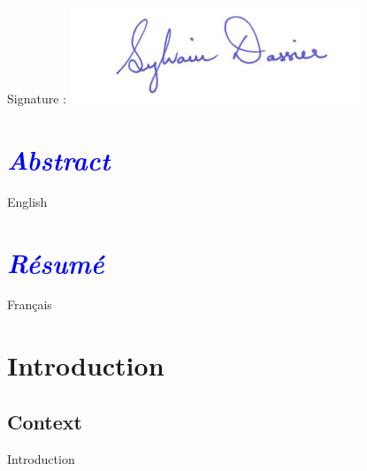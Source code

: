 \documentclass[a4paper,11pt]{article}
\begin{document}
	\vspace{-1cm}
	\hspace{5cm}
	Signature : \includegraphics[scale=0.5]{pictures/signa.jpg}
	
	\clearpage


	\section*{\Huge \textcolor{blue}{\textit{Abstract}}}
	
		\begin{description}
		
			\item \hspace{2cm} English
			
		\end{description}
		
	\section*{\Huge \textcolor{blue}{\textit{Résumé}}}
	
		\begin{description}

			\item \hspace{2cm} Français
			
		\end{description}
		
	

	\clearpage

	\setcounter{tocdepth}{3}

	\tableofcontents

	\clearpage

	
	\section{Introduction}

		\vspace{0.5cm}
		\subsection{Context}
			\begin{description}
				\item \hspace{2cm} Introduction
			\end{description}
	
\end{document}
